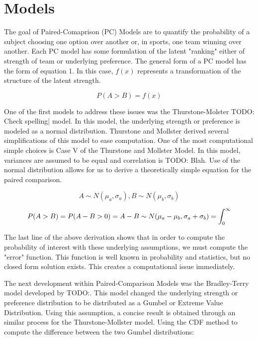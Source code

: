 \documentclass{article}
\begin{document}

\section{Models}

The goal of Paired-Comaprison (PC) Models are to quantify the probability of a subject choosing one option over another or, in sports, one team winning over another. Each PC model has some formulation of the latent "ranking" either of strength of team or underlying preference. The general form of a PC model has the form of equation 1. In this case, $f(x)$ represents a transformation of the structure of the latent strength.

\[ P(A > B) = f(x)\]

One of the first models to address these issues was the Thurstone-Molster TODO: Check spelling| model. In this model, the underlying strength or preference is modeled as a normal distribution. Thurstone and Mollster derived several simplifications of this model to ease computation. One of the most computational simple choices is Case V of the Thurstone and Mollster Model. In this model, variances are assumed to be equal and correlation is TODO: Blah. Use of the normal distribution allows for us to derive a theoretically simple equation for the paired comparison.

\[ A \sim N(\mu_a, \sigma_a), B \sim N(\mu_b, \sigma_b) \]

\[ P(A > B) = P(A - B > 0)\\
            = A - B \sim N(\mu_a - \mu_b, \sigma_a + \sigma_b)\\
            = \int_0^{\infty} \]
            

The last line of the above derivation shows that in order to compute the probability of interest with these underlying assumptions, we must compute the "error" function. This function is well known in probability and statistics, but no closed form solution exists. This creates a computational issue immediately.

The next development within Paired-Comparison Models was the Bradley-Terry model developed by TODO:. This model changed the underlying strength or preference distribution to be distributed as a Gumbel or Extreme Value Distribution. Using this assumption, a concise result is obtained through an similar process for the Thurstone-Mollster model. Using the CDF method to compute the difference between the two Gumbel distributions:
\end{document}
